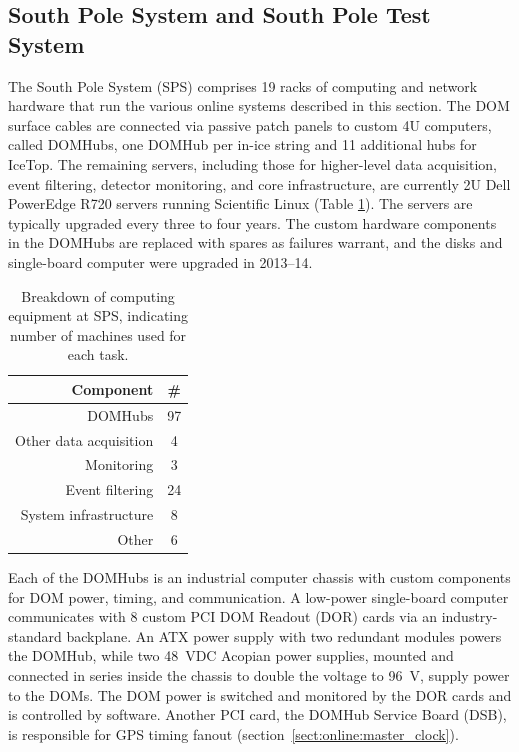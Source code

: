 \subsection{\label{sect:sps}South Pole System and South Pole Test System}

The South Pole System (SPS) comprises 19 racks of computing and network
hardware that run the various online systems described in this
section.  The DOM surface cables are connected via passive patch panels to
custom 4U computers, called DOMHubs, one DOMHub per in-ice string and 11 additional
hubs for IceTop.  The remaining servers, including those for higher-level
data acquisition, event filtering, detector monitoring, and core
infrastructure, are currently 2U Dell PowerEdge R720 servers running
Scientific Linux (Table \ref{tab:sps_breakdown}).  The servers are
typically upgraded every three to four years.  The custom hardware components in
the DOMHubs are replaced with spares as failures warrant, and the disks and
single-board computer were upgraded in 2013--14.

\begin{table}[h]
  \centering
\caption{Breakdown of computing equipment at SPS, indicating number of
    machines used for each task.}
  \begin{tabular}{ r  c }
\hline
    Component & \# \\ \hline DOMHubs & 97 \\ Other data
    acquisition & 4 \\
    Monitoring & 3 \\ Event filtering & 24 \\ System infrastructure & 8 \\ Other &
    6 \\
\hline
  \end{tabular}
  \label{tab:sps_breakdown}
\end{table}

Each of the DOMHubs is an industrial computer chassis with custom components for DOM
power, timing, and communication.  A low-power single-board computer
communicates with 8 custom PCI DOM Readout (DOR) cards via an
industry-standard backplane.  An ATX power supply with two
redundant modules powers the DOMHub, while two
48~VDC Acopian power supplies, mounted and connected in series inside the
chassis to double the voltage to 96~V, supply power to the DOMs.  The DOM power is switched and
monitored by the DOR cards and is controlled by software.  Another PCI
card, the DOMHub Service Board (DSB), is responsible for GPS timing fanout
(section~\ref{sect:online:master_clock}).

